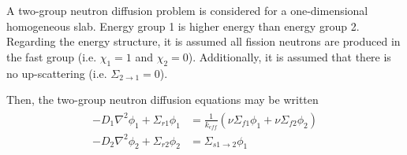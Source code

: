   A two-group neutron diffusion problem is considered for a one-dimensional
  homogeneous slab. Energy group 1 is higher energy than energy group 2. 
  Regarding the energy structure, it is assumed all fission neutrons are 
  produced in the fast group (i.e. $\chi_1=1$ and $\chi_2=0$). Additionally, 
  it is assumed that there is no up-scattering 
  (i.e. $\Sigma_{2\rightarrow1}=0$).
  
  Then, the two-group neutron diffusion equations may be written
  \begin{align} \label{eq:twogroup}
  \begin{split}
    -D_1 \nabla^2 \phi_1 + \Sigma_{r1} \phi_1 &= \frac{1}{k_{eff}} \left(\nu 
      \Sigma_{f1} \phi_1 + \nu \Sigma_{f2} \phi_2 \right) \\
    -D_2 \nabla^2 \phi_2 + \Sigma_{r2} \phi_2 &= \Sigma_{s1\rightarrow2} 
      \phi_1 
  \end{split}
  \end{align}
  

